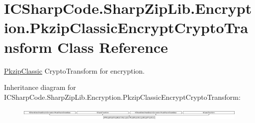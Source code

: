 \hypertarget{class_i_c_sharp_code_1_1_sharp_zip_lib_1_1_encryption_1_1_pkzip_classic_encrypt_crypto_transform}{}\section{I\+C\+Sharp\+Code.\+Sharp\+Zip\+Lib.\+Encryption.\+Pkzip\+Classic\+Encrypt\+Crypto\+Transform Class Reference}
\label{class_i_c_sharp_code_1_1_sharp_zip_lib_1_1_encryption_1_1_pkzip_classic_encrypt_crypto_transform}


\hyperlink{class_i_c_sharp_code_1_1_sharp_zip_lib_1_1_encryption_1_1_pkzip_classic}{Pkzip\+Classic} Crypto\+Transform for encryption.  


Inheritance diagram for I\+C\+Sharp\+Code.\+Sharp\+Zip\+Lib.\+Encryption.\+Pkzip\+Classic\+Encrypt\+Crypto\+Transform\+:\begin{figure}[H]
\begin{center}
\leavevmode
\includegraphics[height=0.623608cm]{class_i_c_sharp_code_1_1_sharp_zip_lib_1_1_encryption_1_1_pkzip_classic_encrypt_crypto_transform}
\end{center}
\end{figure}
